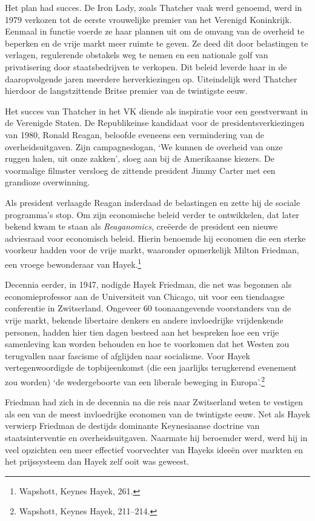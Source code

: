 \documentclass[
  a5paper,
  smalldemyvopaper,11pt,twoside,onecolumn,openright,extrafontsizes,
hidelinks]{memoir}
\begin{document}
Het plan had succes. De Iron Lady, zoals Thatcher vaak werd genoemd,
werd in 1979 verkozen tot de eerste vrouwelijke premier van het Verenigd
Koninkrijk. Eenmaal in functie voerde ze haar plannen uit om de omvang
van de overheid te beperken en de vrije markt meer ruimte te geven. Ze
deed dit door belastingen te verlagen, regulerende obstakels weg te
nemen en een nationale golf van privatisering door staatsbedrijven te
verkopen. Dit beleid leverde haar in de daaropvolgende jaren meerdere
herverkiezingen op. Uiteindelijk werd Thatcher hierdoor de
langstzittende Britse premier van de twintigste eeuw.

Het succes van Thatcher in het VK diende als inspiratie voor een
geestverwant in de Verenigde Staten. De Republikeinse kandidaat voor de
presidentsverkiezingen van 1980, Ronald Reagan, beloofde eveneens een
vermindering van de overheidsuitgaven. Zijn campagneslogan, `We kunnen
de overheid van onze ruggen halen, uit onze zakken', sloeg aan bij de
Amerikaanse kiezers. De voormalige filmster versloeg de zittende
president Jimmy Carter met een grandioze overwinning.

Als president verlaagde Reagan inderdaad de belastingen en zette hij de
sociale programma's stop. Om zijn economische beleid verder te
ontwikkelen, dat later bekend kwam te staan als \emph{Reaganomics},
creëerde de president een nieuwe adviesraad voor economisch beleid.
Hierin benoemde hij economen die een sterke voorkeur hadden voor de
vrije markt, waaronder opmerkelijk Milton Friedman, een vroege
bewonderaar van Hayek.\footnote{Wapshott, Keynes Hayek, 261.}

Decennia eerder, in 1947, nodigde Hayek Friedman, die net was begonnen
als economieprofessor aan de Universiteit van Chicago, uit voor een
tiendaagse conferentie in Zwitserland. Ongeveer 60 toonaangevende
voorstanders van de vrije markt, bekende libertaire denkers en andere
invloedrijke vrijdenkende personen, hadden hier tien dagen besteed aan
het bespreken hoe een vrije samenleving kan worden behouden en hoe te
voorkomen dat het Westen zou terugvallen naar fascisme of afglijden naar
socialisme. Voor Hayek vertegenwoordigde de topbijeenkomst (die een
jaarlijks terugkerend evenement zou worden) `de wedergeboorte van een
liberale beweging in Europa'.\footnote{Wapshott, Keynes Hayek, 211--214.}

Friedman had zich in de decennia na die reis naar Zwitserland weten te
vestigen als een van de meest invloedrijke economen van de twintigste
eeuw. Net als Hayek verwierp Friedman de destijds dominante Keynesiaanse
doctrine van staatsinterventie en overheidsuitgaven. Naarmate hij
beroemder werd, werd hij in veel opzichten een meer effectief
voorvechter van Hayeks ideeën over markten en het prijssysteem dan Hayek
zelf ooit was geweest.
\end{document}
